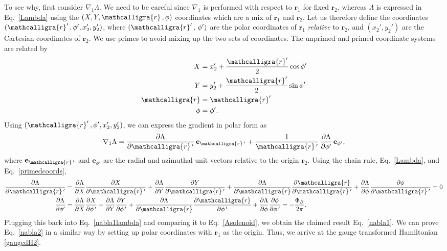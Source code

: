 \documentclass[prx,12pt]{revtex4-2}
\begin{document}
To see why, first consider $\nabla_1\Lambda$.  We need to be careful
since $\nabla_1$ is performed with respect to $\mathbf{r}_1$ for fixed
$\mathbf{r}_2$, whereas $\Lambda$ is expressed in Eq.~\eqref{Lambda}
using the $(X, Y, \mathcalligra{r}\,, \phi)$ coordinates which are a
mix of $\mathbf{r}_1$ and $\mathbf{r}_2$.  Let us therefore define the
coordinates $(\mathcalligra{r}'\,, \phi', x_2', y_2')$, where
$(\mathcalligra{r}'\,,\,\phi')$ are the polar coordinates of
$\mathbf{r}_1$ \textit{relative} to $\mathbf{r}_2$, and $(x_2', y_2')$
are the Cartesian coordinates of $\mathbf{r}_2$.  We use primes to
avoid mixing up the two sets of coordinates.  The unprimed and primed
coordinate systems are related by
\begin{align}
  \begin{aligned}
    X &= x_2' + \frac{\mathcalligra{r}'}{2} \cos\phi' \\
    Y &= y_2' + \frac{\mathcalligra{r}'}{2} \sin\phi' \\
    \mathcalligra{r} &= \mathcalligra{r}' \\
    \phi &= \phi'.
  \end{aligned}
  \label{primedcoords}
\end{align}
Using $(\mathcalligra{r}'\,, \phi', x_2', y_2')$, we can express the
gradient in polar form as
\begin{equation}
  \nabla_1\Lambda =  \frac{\partial
    \Lambda}{\partial \mathcalligra{r}\,'} \, \mathbf{e}_{\mathcalligra{r}\,'}
  + \frac{1}{\mathcalligra{r}\,'} \,\frac{\partial \Lambda}{\partial \phi'}
  \, \mathbf{e}_{\phi'},
  \label{nabla1lambda}
\end{equation}
where $\mathbf{e}_{\mathcalligra{r}\,'}$ and $\mathbf{e}_{\phi'}$ are
the radial and azimuthal unit vectors relative to the origin
$\mathbf{r}_2$.  Using the chain rule, Eq.~\eqref{Lambda}, and
Eq.~\eqref{primedcoords},
\begin{align}
  \frac{\partial\Lambda}{\partial \mathcalligra{r}\,'} &=
  \frac{\partial\Lambda}{\partial X}
  \frac{\partial X}{\partial \mathcalligra{r}\,'}
  +
  \frac{\partial\Lambda}{\partial Y}
  \frac{\partial Y}{\partial \mathcalligra{r}\,'}
  +
  \frac{\partial\Lambda}{\partial \mathcalligra{r}}
  \frac{\partial\mathcalligra{r}}{\partial \mathcalligra{r}\,'}
  +
  \frac{\partial\Lambda}{\partial \phi}
  \frac{\partial\phi}{\partial \mathcalligra{r}\,'} = 0 \\
  \frac{\partial\Lambda}{\partial \phi'} &=
  \frac{\partial\Lambda}{\partial X}
  \frac{\partial X}{\partial \phi\,'}
  +
  \frac{\partial\Lambda}{\partial Y}
  \frac{\partial Y}{\partial \phi\,'}
  +
  \frac{\partial\Lambda}{\partial \mathcalligra{r}}
  \frac{\partial\mathcalligra{r}}{\partial \phi\,'}
  +
  \frac{\partial\Lambda}{\partial \phi}
  \frac{\partial\phi}{\partial \phi\,'} = 
  -\frac{\Phi_B}{2\pi}.
\end{align}
Plugging this back into Eq.~\eqref{nabla1lambda} and comparing it to
Eq.~\eqref{Asolenoid}, we obtain the claimed result
Eq.~\eqref{nabla1}.  We can prove Eq.~\eqref{nabla2} in a similar way
by setting up polar coordinates with $\mathbf{r}_1$ as the origin.
Thus, we arrive at the gauge transformed Hamiltonian \eqref{gaugedH2}.
\end{document}
